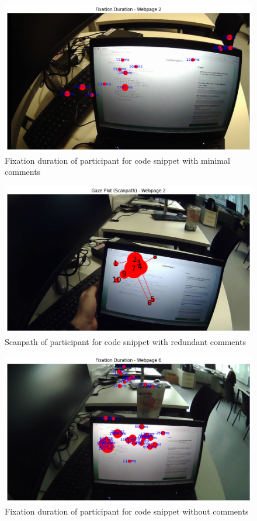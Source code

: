 \begin{figure} [H]
  \centering
  \includegraphics[scale=0.6]{figures/min-com.png}
  \caption{Fixation duration of participant for code snippet with minimal comments}
  \label{fig:AnhangsChor}
\end{figure}


\begin{figure} [H]
  \centering
  \includegraphics[scale=0.6]{figures/redun-com.png}
  \caption{Scanpath of  participant for code snippet with redundant comments}
  \label{fig:AnhangsChor}
\end{figure}


\begin{figure} [H]
  \centering
  \includegraphics[scale=0.6]{figures/0-com.png}
  \caption{Fixation duration of  participant for code snippet without comments}
  \label{fig:AnhangsChor}
\end{figure}



